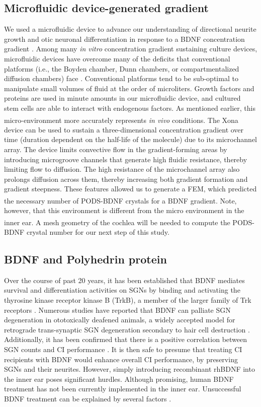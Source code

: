 \documentclass[review]{elsarticle}
\begin{document}
\subsection{Microfluidic device-generated gradient}
We used a microfluidic device to advance our understanding of directional neurite growth and otic neuronal differentiation in response to a BDNF concentration gradient \cite{dravid2020}. Among many \textit{in vitro} concentration gradient sustaining culture devices, microfluidic devices have overcome many of the deficits that conventional platforms (i.e., the Boyden chamber, Dunn chambers, or compartmentalized diffusion chambers) face \cite{dravid2020}. Conventional platforms tend to be sub-optimal to manipulate small volumes of fluid at the order of microliters. Growth factors and proteins are used in minute amounts in our microfluidic device, and cultured stem cells are able to interact with endogenous factors. As mentioned earlier, this micro-environment more accurately represents \textit{in vivo} conditions. The Xona\textsuperscript{\texttrademark} device can be used to sustain a three-dimensional concentration gradient over time (duration dependent on the half-life of the molecule) due to its microchannel array.  The device limits convective flow in the gradient-forming areas by introducing microgroove channels that generate high fluidic resistance, thereby limiting flow to diffusion. The high resistance of the microchannel array also prolongs diffusion across them, thereby increasing both gradient formation and gradient steepness. These features allowed us to generate a FEM, which predicted the necessary number of PODS\textsuperscript{\textregistered}-BDNF crystals for a BDNF gradient. Note, however, that this environment is different from the micro environment in the inner ear. A mesh geometry of the cochlea will be needed to compute the PODS\textsuperscript{\textregistered}-BDNF crystal number for our next step of this study. 

\subsection {BDNF and Polyhedrin protein} 
Over the course of past 20 years, it has been established that BDNF mediates survival and differentiation activities on SGNs by binding and activating the thyrosine kinase receptor kinase B (TrkB), a member of the larger family of Trk receptors \cite{green2012}. Numerous studies have reported that BDNF can palliate SGN degeneration in ototoxically deafened animals, a widely accepted model for retrograde trans-synaptic SGN degeneration secondary to hair cell destruction \cite{Gillespie2003,Pettingill2008,Yamagata2004,Zanin2014}. Additionally, it has been confirmed that there is a positive correlation between SGN counts and CI performance \cite{Seyyedi2014}. It is then safe to presume that treating CI recipients with BDNF would enhance overall CI performance, by preserving SGNs and their neurites. However, simply introducing recombinant rhBDNF into the inner ear poses significant hurdles.  Although promising, human BDNF treatment has not been currently implemented in the inner ear. Unsuccessful BDNF treatment can be explained by several factors \cite{Henriques2010}. 
\end{document}
